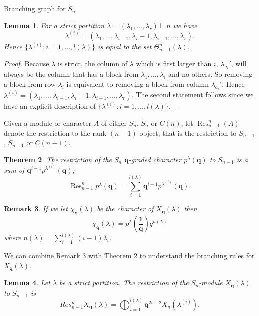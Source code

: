 \documentclass[a4paper,10pt]{amsart}
\newtheorem{theorem}{Theorem}[section]
\newtheorem{lemma}[theorem]{Lemma}
\newtheorem{remark}[theorem]{Remark}
\DeclareMathOperator{\Res}{Res}
\begin{document}
\begin{section}{Branching graph for $\tilde{S}_n$}
\begin{lemma}\label{strictset} For a strict partition $\lambda = (\lambda_1,\ldots ,\lambda_r) \vdash n$
we have $$\lambda^{(i)} = (\lambda_1,\ldots ,\lambda_{i-1},\lambda_{i} -1 , \lambda_{i+1},\ldots ,\lambda_r).$$ 
Hence $\{\lambda^{(i)} : i =1,\ldots ,l(\lambda) \}$ is equal to the set $\Theta^n_{n-1}(\lambda)$. \end{lemma} 

\begin{proof} 

Because $\lambda$ is strict, the column of $\lambda$ which is first larger than $i$, $\lambda_{a_i}'$, will always be the column that has a block from $\lambda_1,\ldots ,\lambda_i$ and no others. So removing a block from row $\lambda_i$ is equivalent to removing a block from column $\lambda_{a_i}'$. Hence $\lambda^{(i)} = (\lambda_1,\ldots ,\lambda_{i-1},\lambda_{i} -1 , \lambda_{i+1},\ldots ,\lambda_r)$. The second statement follows since we have an explicit description of $\{\lambda^{(i)} : i =1,\ldots ,l(\lambda) \}$. \end{proof} %


Given a module or character $A$ of either $S_n$, $\tilde{S}_n$ or $C(n)$,  let $\Res_{n-1}^n(A)$ denote the restriction to the rank $({n-1})$ object, that is the restriction to $S_{n-1}$, $\tilde{S}_{n-1}$ or $C(n-1)$.

\begin{theorem}\label{GPbranching} \cite[3.3]{GP92} The restriction of the $S_n$ $\textbf{q}$-graded character $p^\lambda(\textbf{q})$ to $S_{n-1}$ is a sum of $\textbf{q}^{i-1}p^{\lambda^{(i)}}(\textbf{q})$;
$$\Res^n_{n-1}p^\lambda(\textbf{q}) = \sum_{i=1}^{l(\lambda)} \textbf{q}^{i-1} p^{\lambda^{(i)}}(\textbf{q}).$$
\end{theorem} 

\begin{remark}\label{reverse} If we let $\chi_{\textbf{q}} (\lambda)$ be the character of $X_{\textbf{q}}(\lambda)$ then
$$\chi_{\textbf{q}} (\lambda ) = p^\lambda (\boldsymbol{\frac{1}{q}}) q^{n(\lambda)} $$ 
where $n(\lambda) = \sum_{i=1}^{l(\lambda)} (i-1)\lambda_i$. \end{remark}


We can combine Remark \ref{reverse} with Theorem \ref{GPbranching} to understand the branching rules for $X_{\textbf{q}}(\lambda)$.

\begin{lemma}\label{qres} Let $\lambda$ be a strict partition. The restriction of the $S_n$-module $X_{\textbf{q}}(\lambda)$ to $S_{n-1}$ is
$$Res^{n}_{n-1} X_{\textbf{q}}(\lambda)  =  \bigoplus_{i=1}^{l(\lambda)} \textbf{q}^{2i-2}X_{\textbf{q}}(\lambda^{(i)}).$$
\end{lemma} 


\end{section}
\end{document}
